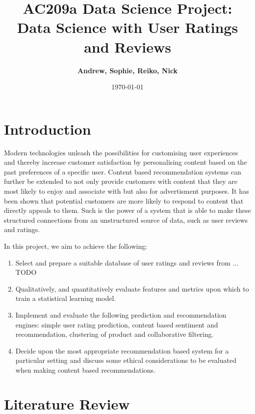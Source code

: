 \documentclass[11pt]{article}
\title{
\vspace{1cm}
\textmd{\textbf{AC209a Data Science Project: Data Science with User Ratings and Reviews}}\\
}
\author{\textbf{Andrew, Sophie, Reiko, Nick}}
\date{\today} %
\begin{document}
\maketitle

\section*{Introduction}
	Modern technologies unleash the possibilities for customising user experiences and thereby increase customer satisfaction by personalising content \cite{beginners_guide}
	based on the past preferences of a specific user. Content based recommendation systems can further be extended to not only provide customers with content that they are most likely to enjoy and associate with but also for advertisment purposes. It has been shown \cite{netflix} that potential customers are more likely to respond to content that directly appeals to them. Such is the power of a system that is able to make these structured connections from an unstructured source of data, such as user reviews and ratings.

	In this project, we aim to achieve the following:
	\begin{enumerate}
		\item Select and prepare a suitable database of user ratings and reviews from ... TODO
		\item Qualitatively, and quantitatively evaluate features and metrics upon which to train a statistical learning model.
		\item Implement and evaluate the following prediction and recommendation engines: simple user rating prediction, content based sentiment and recommendation, clustering of product and collaborative filtering.
		\item Decide upon the most appropriate recommendation based system for a particular setting and discuss some ethical considerations to be evaluated when making content based recommendations.
	\end{enumerate}



\newpage
\section*{Literature Review}
\end{document}
